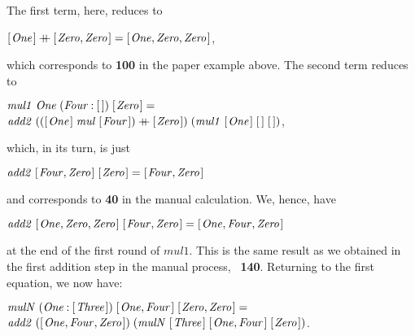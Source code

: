 \documentclass{scrreprt}
\newcommand{\Conid}[1]{\mathit{#1}}
\newcommand{\Varid}[1]{\mathit{#1}}
\newcommand{\plus}{\mathbin{+\!\!\!+}}
\begin{document}
The first term, here, reduces to

\ensuremath{[\mskip1.5mu \Conid{One}\mskip1.5mu]\plus [\mskip1.5mu \Conid{Zero},\Conid{Zero}\mskip1.5mu]\mathrel{=}[\mskip1.5mu \Conid{One},\Conid{Zero},\Conid{Zero}\mskip1.5mu]},

which corresponds to \textbf{100} in the paper example above.
The second term reduces to

\begin{minipage}{\textwidth}
\ensuremath{\Varid{mul1}\;\Conid{One}\;(\Conid{Four}\mathbin{:}[\mskip1.5mu \mskip1.5mu])\;[\mskip1.5mu \Conid{Zero}\mskip1.5mu]\mathrel{=}}\\ 
\ensuremath{\Varid{add2}\;(([\mskip1.5mu \Conid{One}\mskip1.5mu]\;\Varid{mul}\;[\mskip1.5mu \Conid{Four}\mskip1.5mu])\plus [\mskip1.5mu \Conid{Zero}\mskip1.5mu])\;(\Varid{mul1}\;[\mskip1.5mu \Conid{One}\mskip1.5mu]\;[\mskip1.5mu \mskip1.5mu]\;[\mskip1.5mu \mskip1.5mu])},
\end{minipage}

which, in its turn, is just

\ensuremath{\Varid{add2}\;[\mskip1.5mu \Conid{Four},\Conid{Zero}\mskip1.5mu]\;[\mskip1.5mu \Conid{Zero}\mskip1.5mu]\mathrel{=}[\mskip1.5mu \Conid{Four},\Conid{Zero}\mskip1.5mu]}

and corresponds to \textbf{40} in the manual calculation.
We, hence, have

\ensuremath{\Varid{add2}\;[\mskip1.5mu \Conid{One},\Conid{Zero},\Conid{Zero}\mskip1.5mu]\;[\mskip1.5mu \Conid{Four},\Conid{Zero}\mskip1.5mu]\mathrel{=}[\mskip1.5mu \Conid{One},\Conid{Four},\Conid{Zero}\mskip1.5mu]}

at the end of the first round of \ensuremath{\Varid{mul1}}.
This is the same result as we obtained in the 
first addition step in the manual process, \ie\
\textbf{140}.
Returning to the first equation,
we now have:

\begin{minipage}{\textwidth}
\ensuremath{\Varid{mulN}\;(\Conid{One}\mathbin{:}[\mskip1.5mu \Conid{Three}\mskip1.5mu])\;[\mskip1.5mu \Conid{One},\Conid{Four}\mskip1.5mu]\;[\mskip1.5mu \Conid{Zero},\Conid{Zero}\mskip1.5mu]\mathrel{=}}\\
\ensuremath{\Varid{add2}\;([\mskip1.5mu \Conid{One},\Conid{Four},\Conid{Zero}\mskip1.5mu])\;(\Varid{mulN}\;[\mskip1.5mu \Conid{Three}\mskip1.5mu]\;[\mskip1.5mu \Conid{One},\Conid{Four}\mskip1.5mu]\;[\mskip1.5mu \Conid{Zero}\mskip1.5mu])}.
\end{minipage}
\end{document}
